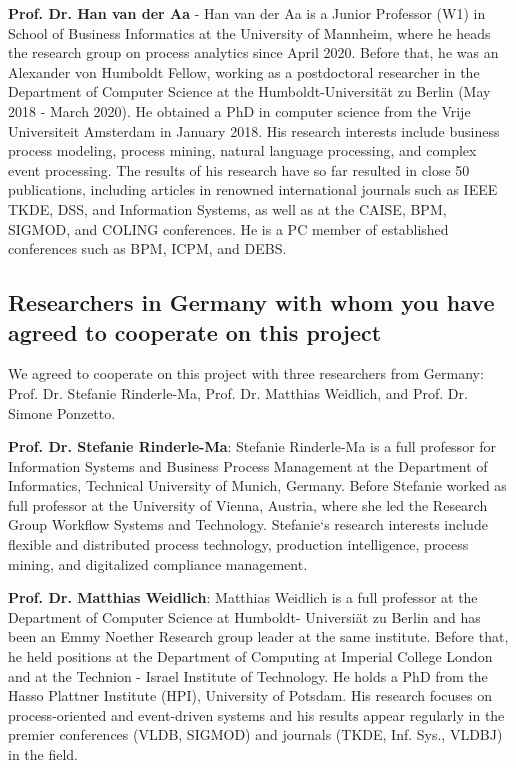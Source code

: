\textbf{Prof. Dr. Han van der Aa} - Han van der Aa is a Junior Professor (W1) in School of Business Informatics at the University of Mannheim, where he heads the research group on process analytics since April 2020. Before that, he was an Alexander von Humboldt Fellow, working as a postdoctoral researcher in the Department of Computer Science at the Humboldt-Universität zu Berlin (May 2018 - March 2020). He obtained a PhD in computer science from the Vrije Universiteit Amsterdam in January 2018. His research interests include business process modeling, process mining, natural language processing, and complex event processing. 
The results of his research have so far resulted in close 50 publications, including articles in 
renowned international journals such as IEEE TKDE, DSS, and Information Systems, as well as at the CAISE, BPM, SIGMOD, and COLING conferences.
He is a PC member of established conferences such as BPM, ICPM, and DEBS.


\subsection{Researchers in Germany with whom you have agreed to cooperate on this project}
\label{sec:collab:germany}

We agreed to cooperate on this project with three researchers from Germany: Prof. Dr. Stefanie Rinderle-Ma, Prof. Dr. Matthias Weidlich, and Prof. Dr. Simone Ponzetto. 

\textbf{Prof. Dr. Stefanie Rinderle-Ma}: Stefanie Rinderle-Ma is a full professor for Information Systems and Business Process Management at the Department of Informatics, Technical University of Munich, Germany. Before Stefanie worked as full professor at the University of Vienna, Austria, where she led the Research Group Workflow Systems and Technology. Stefanie‘s research interests include flexible and distributed process technology, production intelligence, process mining, and digitalized compliance management.
 
\textbf{Prof. Dr. Matthias Weidlich}: Matthias Weidlich is a full professor at the Department of Computer Science at Humboldt- Universi\"at zu Berlin and has been an Emmy Noether Research group leader at the same institute. Before that, he held positions at the Department of Computing at Imperial College London and at the Technion - Israel Institute of Technology. He holds a PhD from the Hasso Plattner Institute (HPI), University of Potsdam. His research focuses on process-oriented and event-driven systems and his results appear regularly in the premier conferences (VLDB, SIGMOD) and journals (TKDE, Inf. Sys., VLDBJ) in the field.

